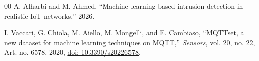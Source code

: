 \documentclass[conference]{IEEEtran}
\begin{document}
\begin{thebibliography}{00}
A. Alharbi and M. Ahmed,
``Machine-learning-based intrusion detection in realistic IoT
networks,''
2026.

I. Vaccari, G. Chiola, M. Aiello, M. Mongelli, and E. Cambiaso,
``MQTTset, a new dataset for machine learning techniques on MQTT,''
\emph{Sensors}, vol. 20, no. 22, Art. no. 6578, 2020,
\href{https://doi.org/10.3390/s20226578}{doi: 10.3390/s20226578}.

\end{thebibliography}
\end{document}
